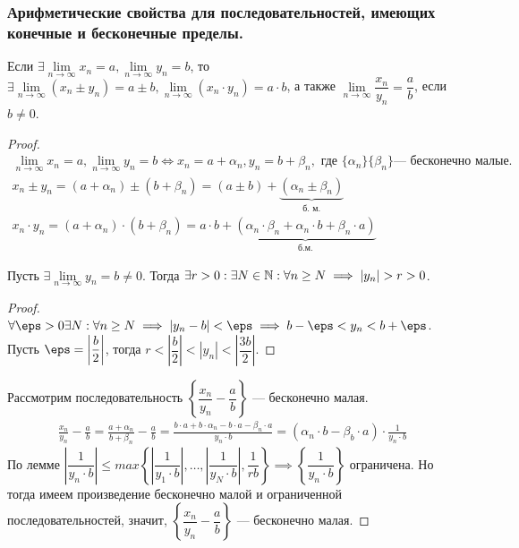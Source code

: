 \documentclass[12pt, a4paper]{article}
\begin{document}
	\subsubsection{Арифметические свойства для последовательностей, имеющих конечные и бесконечные пределы.} 
	Если $\exists \lim\limits_{n \to \infty} x_n = a, \lim\limits_{n \to \infty} y_n = b$, то $\exists \lim\limits_{n \to \infty} (x_n \pm y_n) = a \pm b, \lim\limits_{n \to \infty} (x_n \cdot y_n) = a \cdot b$, а также $\lim\limits_{n \to \infty} \dfrac{x_n}{y_n} = \dfrac{a}{b}$, если $b \neq 0$.
	\begin{proof}
		\[\begin{gathered}
			\lim_{n \to \infty} x_n = a, \lim_{n \to \infty} y_n = b \iff x_n = a + \alpha_n, y_n = b + \beta_n, \text{ где } \{\alpha_n\} \{\beta_n\} \text{--- бесконечно малые.} \\
			x_n \pm y_n = (a + \alpha_n) \pm (b + \beta_n) = (a \pm b) + \underbrace{(\alpha_n \pm \beta_n)}_{\text{б. м.}} \\
			x_n \cdot y_n = (a + \alpha_n) \cdot (b + \beta_n) = a \cdot b + \underbrace{(\alpha_n \cdot \beta_n + \alpha_n \cdot b + \beta_n \cdot a)}_{\text{б.м.}}
		\end{gathered}\]
		\begin{lemma}
			Пусть $\exists \lim\limits_{n \to \infty} y_n = b \neq 0$. Тогда $\exists r > 0: \exists N \in \mathbb{N}: \forall n \geq N \implies |y_n| > r > 0$.
		\end{lemma}
		\begin{proof}
			$\forall \eps > 0 \exists N: \forall n \geq N \implies |y_n - b| < \eps \implies b - \eps < y_n < b + \eps$. Пусть $\eps = \left|\dfrac{b}{2}\right|$, тогда $r < \left|\dfrac{b}{2}\right| < |y_n| < \left|\dfrac{3b}{2}\right|$.
		\end{proof}
		Рассмотрим последовательность $\left\{\dfrac{x_n}{y_n} - \dfrac{a}{b}\right\}$ --- бесконечно малая.
		\[\begin{gathered}
			\frac{x_n}{y_n} - \frac{a}{b} = \frac{a + \alpha_n}{b + \beta_n} - \frac{a}{b}
			= \frac{b \cdot a + b \cdot \alpha_n - b \cdot a - \beta_n \cdot a}{y_n \cdot b}
			= (\alpha_n \cdot b - \beta_b \cdot a) \cdot \frac{1}{y_n \cdot b}
		\end{gathered}\]
		По лемме $\left|\dfrac{1}{y_n \cdot b}\right| \leq max\left\{\left|\dfrac{1}{y_1 \cdot b}\right|, \dots, \left|\dfrac{1}{y_N \cdot b}\right|, \dfrac{1}{rb} \right\} \implies \left\{\dfrac{1}{y_n \cdot b}\right\}$ ограничена. Но тогда имеем произведение бесконечно малой и ограниченной последовательностей, значит, $\left\{\dfrac{x_n}{y_n} - \dfrac{a}{b}\right\}$ --- бесконечно малая.
	\end{proof}
\end{document}
